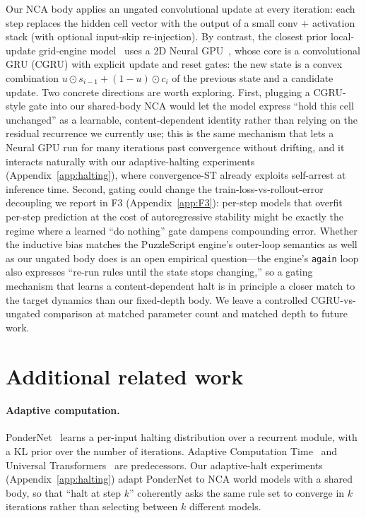Our NCA body applies an ungated convolutional update at every iteration: each step replaces the hidden cell vector with the output of a small conv $+$ activation stack (with optional input-skip re-injection).
By contrast, the closest prior local-update grid-engine model~\cite{bamford2020neural} uses a 2D Neural GPU~\cite{kaiser2016neuralgpu}, whose core is a convolutional GRU (CGRU) with explicit update and reset gates: the new state is a convex combination $u \odot s_{i-1} + (1-u) \odot c_i$ of the previous state and a candidate update.
Two concrete directions are worth exploring.
First, plugging a CGRU-style gate into our shared-body NCA would let the model express ``hold this cell unchanged'' as a learnable, content-dependent identity rather than relying on the residual recurrence we currently use; this is the same mechanism that lets a Neural GPU run for many iterations past convergence without drifting, and it interacts naturally with our adaptive-halting experiments (Appendix~\ref{app:halting}), where convergence-ST already exploits self-arrest at inference time.
Second, gating could change the train-loss-vs-rollout-error decoupling we report in F3 (Appendix~\ref{app:F3}): per-step models that overfit per-step prediction at the cost of autoregressive stability might be exactly the regime where a learned ``do nothing'' gate dampens compounding error.
Whether the inductive bias matches the PuzzleScript engine's outer-loop semantics as well as our ungated body does is an open empirical question---the engine's \texttt{again} loop also expresses ``re-run rules until the state stops changing,'' so a gating mechanism that learns a content-dependent halt is in principle a closer match to the target dynamics than our fixed-depth body.
We leave a controlled CGRU-vs-ungated comparison at matched parameter count and matched depth to future work.

\section{Additional related work}
\label{app:related}

\paragraph{Adaptive computation.}
PonderNet~\cite{banino2021pondernet} learns a per-input halting
distribution over a recurrent module, with a KL prior over the number
of iterations. Adaptive Computation Time~\cite{graves2016act} and
Universal Transformers~\cite{dehghani2018universal} are predecessors.
Our adaptive-halt experiments
(Appendix~\ref{app:halting}) adapt PonderNet to NCA world models
with a shared body, so that ``halt at step $k$'' coherently asks the
same rule set to converge in $k$ iterations rather than selecting
between $k$ different models.

